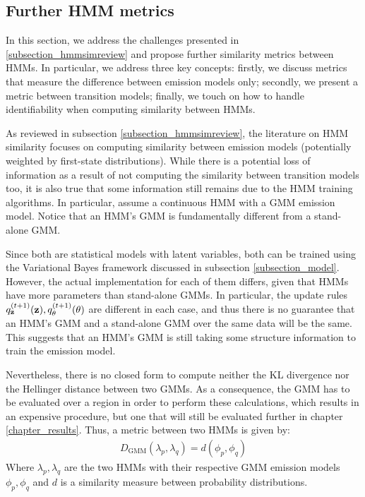 \documentclass[../main.tex]{subfiles}
\begin{document}
\subsection{Further HMM metrics} \label{subsection_hmmsim}
In this section, we address the challenges presented in \ref{subsection_hmmsimreview} and propose further similarity metrics between HMMs. In particular, we address three key concepts: firstly, we discuss metrics that measure the difference between emission models only; secondly, we present a metric between transition models; finally, we touch on how to handle identifiability when computing similarity between HMMs.
\par As reviewed in subsection \ref{subsection_hmmsimreview}, the literature on HMM similarity focuses on computing similarity between emission models (potentially weighted by first-state distributions). While there is a potential loss of information as a result of not computing the similarity between transition models too, it is also true that some information still remains due to the HMM training algorithms. In particular, assume a continuous HMM with a GMM emission model. Notice that an HMM's GMM is fundamentally different from a stand-alone GMM.
\par Since both are statistical models with latent variables, both can be trained using the Variational Bayes framework discussed in subsection \ref{subsection_model}. However, the actual implementation for each of them differs, given that HMMs have more parameters than stand-alone GMMs. In particular, the update rules $q_{\mathbf{z}}^{(t+1)}(\mathbf{z}), q_{\theta}^{(t+1)}(\theta)$ are different in each case, and thus there is no guarantee that an HMM's GMM and a stand-alone GMM over the same data will be the same. This suggests that an HMM's GMM is still taking some structure information to train the emission model.
\par Nevertheless, there is no closed form to compute neither the KL divergence nor the Hellinger distance between two GMMs. As a consequence, the GMM has to be evaluated over a region in order to perform these calculations, which results in an expensive procedure, but one that will still be evaluated further in chapter \ref{chapter_results}. Thus, a metric between two HMMs is given by:
\begin{align*}
D_{\text{GMM}}(\lambda_p, \lambda_q) = d( \phi_p, \phi_q )
\end{align*}
Where $\lambda_p, \lambda_q$ are the two HMMs with their respective GMM emission models $\phi_p, \phi_q$ and $d$ is a similarity measure between probability distributions.
\end{document}
